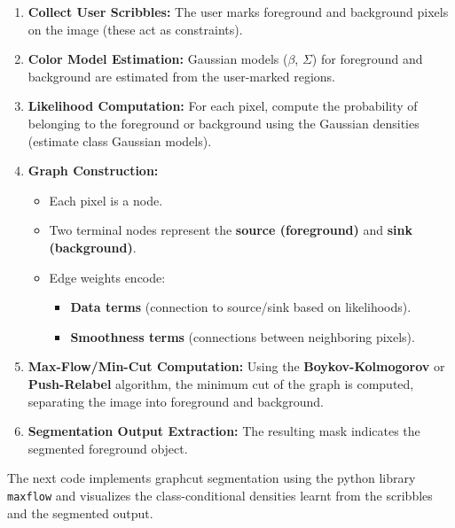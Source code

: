 \documentclass[11pt]{article}
\providecommand{\tightlist}{%
      \setlength{\itemsep}{0pt}\setlength{\parskip}{0pt}}
\begin{document}
\begin{enumerate}
\def\labelenumi{\arabic{enumi}.}
\item
  \textbf{Collect User Scribbles:} The user marks foreground and
  background pixels on the image (these act as constraints).
\item
  \textbf{Color Model Estimation:} Gaussian models (\(\beta\),
  \(\Sigma\)) for foreground and background are estimated from the
  user-marked regions.
\item
  \textbf{Likelihood Computation:} For each pixel, compute the
  probability of belonging to the foreground or background using the
  Gaussian densities (estimate class Gaussian models).
\item
  \textbf{Graph Construction:}

  \begin{itemize}
  \item
    Each pixel is a node.
  \item
    Two terminal nodes represent the \textbf{source (foreground)} and
    \textbf{sink (background)}.
  \item
    Edge weights encode:

    \begin{itemize}
    \tightlist
    \item
      \textbf{Data terms} (connection to source/sink based on
      likelihoods).
    \item
      \textbf{Smoothness terms} (connections between neighboring
      pixels).
    \end{itemize}
  \end{itemize}
\item
  \textbf{Max-Flow/Min-Cut Computation:} Using the
  \textbf{Boykov-Kolmogorov} or \textbf{Push-Relabel} algorithm, the
  minimum cut of the graph is computed, separating the image into
  foreground and background.
\item
  \textbf{Segmentation Output Extraction:} The resulting mask indicates
  the segmented foreground object.
\end{enumerate}

The next code implements graphcut segmentation using the python library
\texttt{maxflow} and visualizes the class-conditional densities learnt
from the scribbles and the segmented output.
\end{document}
